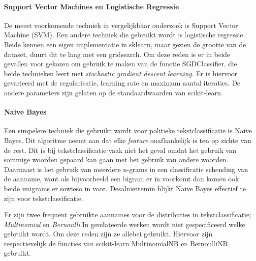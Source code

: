 \paragraph{Support Vector Machines en Logistische Regressie}
De meest voorkomende techniek in vergelijkbaar onderzoek is Support Vector Machine (SVM). Een andere techniek die gebruikt wordt is logistische regressie. Beide kennen een eigen implementatie in sklearn, maar gezien de grootte van de dataset, duurt dit te lang met een gridsearch. Om deze reden is er in beide gevallen voor gekozen om gebruik te maken van de functie SGDClassifier, die beide technieken leert met \textit{stochastic gradient descent learning}. Er is hiervoor gevarieerd met de regularisatie, learning rate en maximum aantal iteraties. De andere parameters zijn gelaten op de standaardwaarden van scikit-learn\cite{scikit-learn}.\par
\paragraph{Naive Bayes}
Een simpelere techniek die gebruikt wordt voor politieke tekstclassificatie is Naive Bayes. Dit algoritme neemt aan dat elke \textit{feature} onafhankelijk is ten op zichte van de rest. Dit is bij tekstclassificatie vaak niet het geval omdat het gebruik van sommige woorden gepaard kan gaan met het gebruik van andere woorden. Daarnaast is het gebruik van meerdere n-grams in een classificatie schending van de aanname, want als bijvoorbeeld een bigram er in voorkomt dan komen ook beide unigrams er sowieso in voor. Desalniettemin blijkt Naive Bayes effectief te zijn voor tekstclassificatie\cite{scikit-learn,bhand}. \par
Er zijn twee frequent gebruikte aannames voor de distributies in tekstclassificatie; \textit{Multinomial} en \textit{Bernoulli}.In gerelateerde werken wordt niet gespecificeerd welke gebruikt wordt. Om deze reden zijn ze allebei gebruikt. Hiervoor zijn respectievelijk de functies van scikit-learn MultinomialNB en BernoulliNB gebruikt.\cite{scikit-learn,bhand}\par
